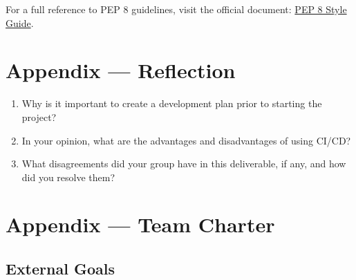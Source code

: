 \documentclass{article}
\begin{document}
For a full reference to PEP 8 guidelines, visit the official document: \href{https://peps.python.org/pep-0008/}{PEP 8 Style Guide}.


\newpage{}

\section*{Appendix --- Reflection}




\begin{enumerate}
    \item Why is it important to create a development plan prior to starting the
    project?
    \item In your opinion, what are the advantages and disadvantages of using
    CI/CD?
    \item What disagreements did your group have in this deliverable, if any,
    and how did you resolve them?
\end{enumerate}

\newpage{}

\section*{Appendix --- Team Charter}

\subsection*{External Goals}
\end{document}
